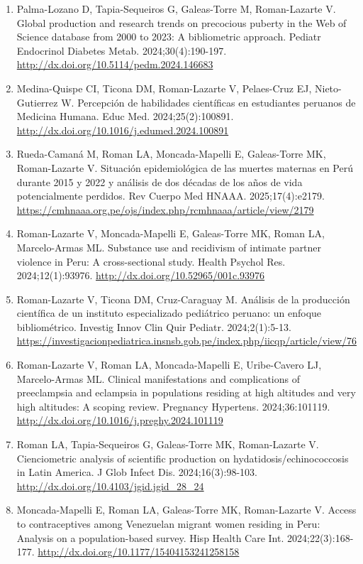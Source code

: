 \documentclass[11pt,a4paper]{article}
\begin{document}
\begin{enumerate}[leftmargin=*]
\item Palma-Lozano D, Tapia-Sequeiros G, Galeas-Torre M, Roman-Lazarte V. Global production and research trends on precocious puberty in the Web of Science database from 2000 to 2023: A bibliometric approach. Pediatr Endocrinol Diabetes Metab. 2024;30(4):190-197. \url{http://dx.doi.org/10.5114/pedm.2024.146683}
\item Medina-Quispe CI, Ticona DM, Roman-Lazarte V, Pelaes-Cruz EJ, Nieto-Gutierrez W. Percepción de habilidades científicas en estudiantes peruanos de Medicina Humana. Educ Med. 2024;25(2):100891. \url{http://dx.doi.org/10.1016/j.edumed.2024.100891}
\item Rueda-Camaná M, Roman LA, Moncada-Mapelli E, Galeas-Torre MK, Roman-Lazarte V. Situación epidemiológica de las muertes maternas en Perú durante 2015 y 2022 y análisis de dos décadas de los años de vida potencialmente perdidos. Rev Cuerpo Med HNAAA. 2025;17(4):e2179. \url{https://cmhnaaa.org.pe/ojs/index.php/rcmhnaaa/article/view/2179}
\item Roman-Lazarte V, Moncada-Mapelli E, Galeas-Torre MK, Roman LA, Marcelo-Armas ML. Substance use and recidivism of intimate partner violence in Peru: A cross-sectional study. Health Psychol Res. 2024;12(1):93976. \url{http://dx.doi.org/10.52965/001c.93976}
\item Roman-Lazarte V, Ticona DM, Cruz-Caraguay M. Análisis de la producción científica de un instituto especializado pediátrico peruano: un enfoque bibliométrico. Investig Innov Clin Quir Pediatr. 2024;2(1):5-13. \url{https://investigacionpediatrica.insnsb.gob.pe/index.php/iicqp/article/view/76}
\item Roman-Lazarte V, Roman LA, Moncada-Mapelli E, Uribe-Cavero LJ, Marcelo-Armas ML. Clinical manifestations and complications of preeclampsia and eclampsia in populations residing at high altitudes and very high altitudes: A scoping review. Pregnancy Hypertens. 2024;36:101119. \url{http://dx.doi.org/10.1016/j.preghy.2024.101119}
\item Roman LA, Tapia-Sequeiros G, Galeas-Torre MK, Roman-Lazarte V. Cienciometric analysis of scientific production on hydatidosis/echinococcosis in Latin America. J Glob Infect Dis. 2024;16(3):98-103. \url{http://dx.doi.org/10.4103/jgid.jgid_28_24}
\item Moncada-Mapelli E, Roman LA, Galeas-Torre MK, Roman-Lazarte V. Access to contraceptives among Venezuelan migrant women residing in Peru: Analysis on a population-based survey. Hisp Health Care Int. 2024;22(3):168-177. \url{http://dx.doi.org/10.1177/15404153241258158}

\end{enumerate}
\end{document}
